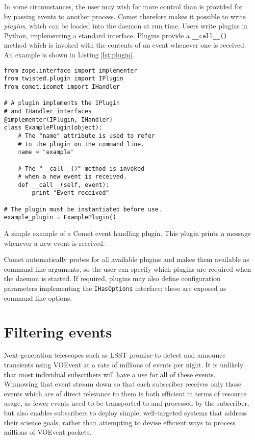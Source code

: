 \documentclass[5p,authoryear]{elsarticle}
\begin{document}
In some circumstances, the user may wish for more control than is provided for
by passing events to another process. Comet therefore makes it possible to
write \textit{plugins}, which can be loaded into the daemon at run time.
Users write plugins in Python, implementing a standard interface. Plugins
provide a \texttt{\_\_call\_\_()} method which is invoked with the contents of
an event whenever one is received. An example is shown in Listing
\ref{lst:plugin}.

\begin{listing}
\begin{verbatim}
from zope.interface import implementer
from twisted.plugin import IPlugin
from comet.icomet import IHandler

# A plugin implements the IPlugin
# and IHandler interfaces
@implementer(IPlugin, IHandler)
class ExamplePlugin(object):
    # The "name" attribute is used to refer
    # to the plugin on the command line.
    name = "example"

    # The "__call__()" method is invoked
    # when a new event is received.
    def __call__(self, event):
        print "Event received"

# The plugin must be instantiated before use.
example_plugin = ExamplePlugin()
\end{verbatim}
\caption{A simple example of a Comet event handling plugin. This plugin prints
a message whenever a new event is received.}
\label{lst:plugin}
\end{listing}

Comet automatically probes for all available plugins and makes them available
as command line arguments, so the user can specify which plugins are required
when the daemon is started. If required, plugins may also define configuration
parameters implementing the \texttt{IHasOptions} interface; these are exposed
as command line options.

\section{Filtering events}
\label{sec:filter}

Next-generation telescopes such as LSST promise to detect and announce
transients using VOEvent at a rate of millions of events per night.  It is
unlikely that most individual subscribers will have a use for all of these
events. Winnowing that event stream down so that each subscriber receives only
those events which are of direct relevance to them is both efficient in terms
of resource usage, as fewer events need to be transported to and processed by
the subscriber, but also enables subscribers to deploy simple, well-targeted
systems that address their science goals, rather than attempting to devise
efficient ways to process millions of VOEvent packets.
\end{document}
